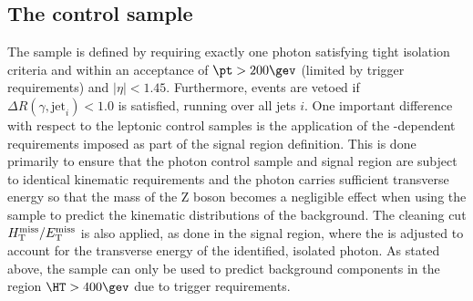 \subsection{The \texorpdfstring{\gj}{photon plus jets} control sample}
\label{subsec:photoncontrolSelection}


The \gj sample is defined by requiring exactly one photon satisfying
tight isolation criteria and within an acceptance of $\pt > 200\gev$
(limited by trigger requirements) and $|\eta| < 1.45$. Furthermore,
events are vetoed if $\Delta R(\gamma,\textrm{jet}_i) < 1.0$ is
satisfied, running over all jets $i$. One important difference with
respect to the leptonic control samples is the application of the
\HT-dependent \alphat requirements imposed as part of the signal
region definition. This is done primarily to ensure that the photon
control sample and signal region are subject to identical kinematic
requirements and the photon carries sufficient transverse energy so
that the mass of the Z boson becomes a negligible effect when using
the \gj sample to predict the kinematic distributions of the \znunu
background. The cleaning cut $\mbox{$H_{\rm T}^{\rm miss}$}/\mbox{$E_\text{T}^{\rm miss}$}$ is also applied, as done in
the signal region, where the \met is adjusted to account for the
transverse energy of the identified, isolated photon. As stated above,
the \gj sample can only be used to predict background components in
the region $\HT > 400\gev$ due to trigger requirements.

